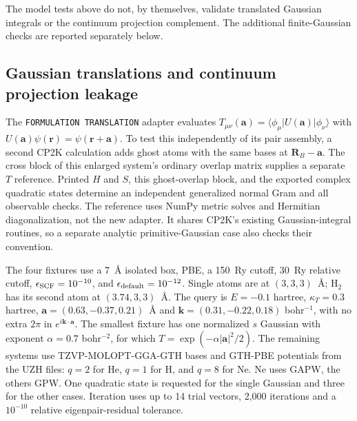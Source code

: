 \documentclass[11pt]{article}
\begin{document}
The model tests above do not, by themselves, validate translated
Gaussian integrals or the continuum projection complement. The
additional finite-Gaussian checks are reported separately below.

\subsection{Gaussian translations and continuum projection leakage}
\label{sec:si-gaussian-translation}
The \texttt{FORMULATION TRANSLATION} adapter evaluates
$T_{\mu\nu}(\bm a)=\langle\phi_\mu|U(\bm a)|\phi_\nu\rangle$
with $U(\bm a)\psi(\bm r)=\psi(\bm r+\bm a)$.
To test this independently of its pair assembly, a second CP2K
calculation adds ghost atoms with the same bases at
$\bm R_B-\bm a$. The cross block of this enlarged system's
ordinary overlap matrix supplies a separate $T$ reference.
Printed $H$ and $S$, this ghost-overlap block, and the exported
complex quadratic states determine an independent generalized
normal Gram and all observable checks. The reference uses NumPy
metric solves and Hermitian diagonalization, not the new adapter.
It shares CP2K's existing Gaussian-integral routines, so a separate
analytic primitive-Gaussian case also checks their convention.

The four fixtures use a 7~\AA{} isolated box, PBE, a 150~Ry
cutoff, 30~Ry relative cutoff, $\epsilon_{\rm SCF}=10^{-10}$,
and $\epsilon_{\rm default}=10^{-12}$. Single atoms are at
$(3,3,3)$~\AA; H$_2$ has its second atom at
$(3.74,3,3)$~\AA. The query is
$E=-0.1$ hartree, $\kappa_T=0.3$ hartree,
$\bm a=(0.63,-0.37,0.21)$~\AA{} and
$\bm k=(0.31,-0.22,0.18)$ bohr$^{-1}$, with no extra $2\pi$
in $e^{i\bm k\cdot\bm a}$. The smallest fixture has one
normalized $s$ Gaussian with exponent $\alpha=0.7$ bohr$^{-2}$,
for which $T=\exp(-\alpha|\bm a|^2/2)$.
The remaining systems use TZVP-MOLOPT-GGA-GTH bases and GTH-PBE
potentials from the UZH files: $q=2$ for He, $q=1$ for H, and
$q=8$ for Ne. Ne uses GAPW, the others GPW.
One quadratic state is requested for the single Gaussian and
three for the other cases. Iteration uses up to 14 trial vectors,
2,000 iterations and a $10^{-10}$ relative eigenpair-residual
tolerance.
\end{document}
